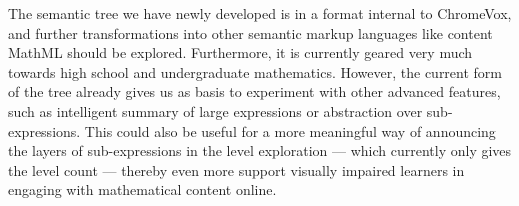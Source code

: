 \documentclass{sig-alternate}
\begin{document}
The semantic tree we have newly developed is in a format internal to ChromeVox,
and further transformations into other semantic markup languages like content
MathML should be explored. Furthermore, it is currently geared very much towards
high school and undergraduate mathematics.  However, the current form of the
tree already gives us as basis to experiment with other advanced features, such
as intelligent summary of large expressions or abstraction over
sub-expressions. This could also be useful for a more meaningful way of
announcing the layers of sub-expressions in the level exploration --- which
currently only gives the level count --- thereby even more support visually
impaired learners in engaging with mathematical content online.


%  
\end{document}
